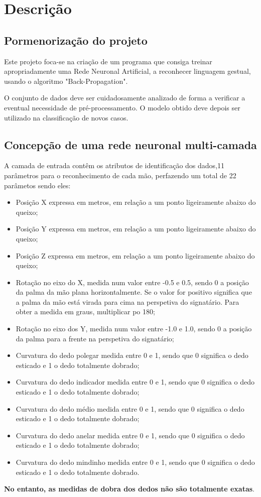 \documentclass[10pt,a4paper]{article}
\begin{document}
\section{Descrição}

\subsection{Pormenorização do projeto}
\subitem

Este projeto foca-se na criação de um programa que consiga treinar apropriadamente uma Rede Neuronal Artificial, a reconhecer linguagem gestual, usando o algoritmo "Back-Propagation". 

O conjunto de dados deve ser cuidadosamente analizado de forma a verificar a eventual necessidade de pré-processamento. O modelo obtido deve depois ser utilizado na classificação de novos casos. 

\subsection{Concepção de uma rede neuronal multi-camada}
\subitem

A camada de entrada contêm os atributos de identificação dos dados,11 parâmetros para o reconhecimento de cada mão, perfazendo um total de 22 parâmetos sendo eles:
\begin{itemize}
\item Posição X expressa em metros, em relação a um ponto ligeiramente abaixo do queixo;
\item Posição Y expressa em metros, em relação a um ponto ligeiramente abaixo do queixo;
\item Posição Z expressa em metros, em relação a um ponto ligeiramente abaixo do queixo;
\item Rotação no eixo do X, medida num valor entre -0.5 e 0.5, sendo 0 a posição da palma da mão plana horizontalmente. Se o valor for positivo significa que a palma da mão está virada para cima na perspetiva do signatário. Para obter a medida em graus, multiplicar po 180;
\item Rotação no eixo dos Y, medida num valor entre -1.0 e 1.0, sendo 0 a posição da palma para a frente na perspetiva do signatário;
\item Curvatura do dedo polegar medida entre 0 e 1, sendo que 0 significa o dedo esticado e 1 o dedo totalmente dobrado;
\item Curvatura do dedo indicador medida entre 0 e 1, sendo que 0 significa o dedo esticado e 1 o dedo totalmente dobrado;
\item Curvatura do dedo médio medida entre 0 e 1, sendo que 0 significa o dedo esticado e 1 o dedo totalmente dobrado;
\item Curvatura do dedo anelar medida entre 0 e 1, sendo que 0 significa o dedo esticado e 1 o dedo totalmente dobrado;
\item Curvatura do dedo mindinho medida entre 0 e 1, sendo que 0 significa o dedo esticado e 1 o dedo totalmente dobrado.
\end{itemize}
\textbf{No entanto, as medidas de dobra dos dedos não são totalmente exatas}.
\end{document}
